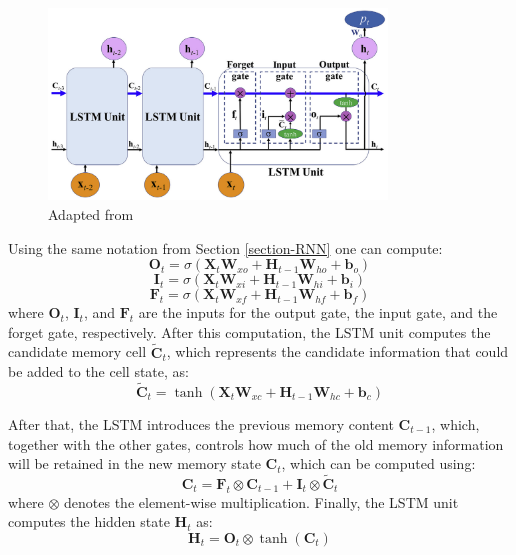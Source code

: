 \begin{figure}[H]
    \centering
    \includegraphics[width=9cm]{Cap2_LitReview/model_basics/LSTM/LSTM_Arch.png}
    \caption{Adapted from \cite{WEI2021453}}
    \label{fig:LSTM-struct}
\end{figure}

Using the same notation from Section \ref{section-RNN} one can compute:
\begin{equation}
    \boldsymbol{O}_t = \sigma\left(\boldsymbol{X}_t \boldsymbol{W}_{xo} + \boldsymbol{H}_{t-1}\boldsymbol{W}_{ho} + \boldsymbol{b}_o\right)
    \label{eq-LSTM-Ot}
\end{equation}
\begin{equation}
    \boldsymbol{I}_t = \sigma\left(\boldsymbol{X}_t \boldsymbol{W}_{xi} + \boldsymbol{H}_{t-1}\boldsymbol{W}_{hi} + \boldsymbol{b}_i\right)
    \label{eq-LSTM-It}
\end{equation}
\begin{equation}
    \boldsymbol{F}_t = \sigma\left(\boldsymbol{X}_t \boldsymbol{W}_{xf} + \boldsymbol{H}_{t-1}\boldsymbol{W}_{hf} + \boldsymbol{b}_f\right)
    \label{eq-LSTM-Ft}
\end{equation}
where $\boldsymbol{O}_t$, $\boldsymbol{I}_t$, and $\boldsymbol{F}_t$ are the inputs for the output gate, the input gate, and the forget gate, respectively. After this computation, the LSTM unit computes the candidate memory cell $\boldsymbol{\tilde{C}}_t$, which represents the candidate information that could be added to the cell state, as:
\begin{equation}
    \boldsymbol{\tilde{C}}_t = \tanh \left(\boldsymbol{X}_t \boldsymbol{W}_{xc} + \boldsymbol{H}_{t-1}\boldsymbol{W}_{hc} + \boldsymbol{b}_c\right)
    \label{eq-CNN-Candidate}
\end{equation}

After that, the LSTM introduces the previous memory content $\boldsymbol{C}_{t-1}$, which, together with the other gates, controls how much of the old memory information will be retained in the new memory state $\boldsymbol{C}_{t}$, which can be computed using: 
\begin{equation}
    \boldsymbol{C}_t = \boldsymbol{F}_t \otimes \boldsymbol{C}_{t-1} + \boldsymbol{I}_t \otimes \boldsymbol{\tilde{C}}_t
\end{equation}
where $\otimes$ denotes the element-wise multiplication. Finally, the LSTM unit computes the hidden state $\boldsymbol{H}_t$ as:
\begin{equation}
    \boldsymbol{H}_t = \boldsymbol{O}_t \otimes \tanh (\boldsymbol{C}_t)
\end{equation}

